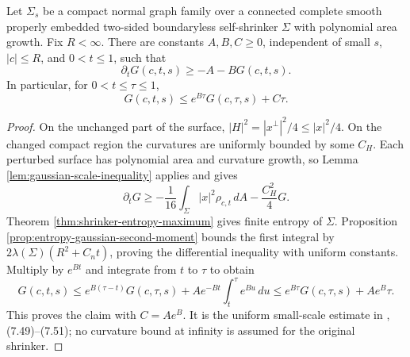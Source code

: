 \begin{lemma}\label{lem:entropy-small-scale-control}
Let $\Sigma_s$ be a compact normal graph family over a connected complete smooth properly embedded two-sided boundaryless self-shrinker $\Sigma$ with polynomial area growth. Fix $R<\infty$. There are constants $A,B,C\geq0$, independent of small $s$, $|c|\leq R$, and $0<t\leq1$, such that
\[
 \partial_tG(c,t,s)\geq-A-BG(c,t,s).
\]
In particular, for $0<t\leq\tau\leq1$,
\[
 G(c,t,s)\leq e^{B\tau}G(c,\tau,s)+C\tau.
\]
\end{lemma}
\begin{proof}
On the unchanged part of the surface, $|H|^2=|x^\perp|^2/4\leq|x|^2/4$. On the changed compact region the curvatures are uniformly bounded by some $C_H$. Each perturbed surface has polynomial area and curvature growth, so Lemma \ref{lem:gaussian-scale-inequality} applies and gives
\[
 \partial_tG\geq-\frac1{16}\int_\Sigma|x|^2\rho_{c,t}\,dA
 -\frac{C_H^2}{4}G.
\]
Theorem \ref{thm:shrinker-entropy-maximum} gives finite entropy of $\Sigma$. Proposition \ref{prop:entropy-gaussian-second-moment} bounds the first integral by $2\lambda(\Sigma)(R^2+C_nt)$, proving the differential inequality with uniform constants. Multiply by $e^{Bt}$ and integrate from $t$ to $\tau$ to obtain
\[
 G(c,t,s)\leq e^{B(\tau-t)}G(c,\tau,s)
 +A e^{-Bt}\int_t^\tau e^{Bu}\,du
 \leq e^{B\tau}G(c,\tau,s)+Ae^B\tau.
\]
This proves the claim with $C=Ae^B$. It is the uniform small-scale estimate in \cite{CM12}, (7.49)--(7.51); no curvature bound at infinity is assumed for the original shrinker.
\end{proof}

